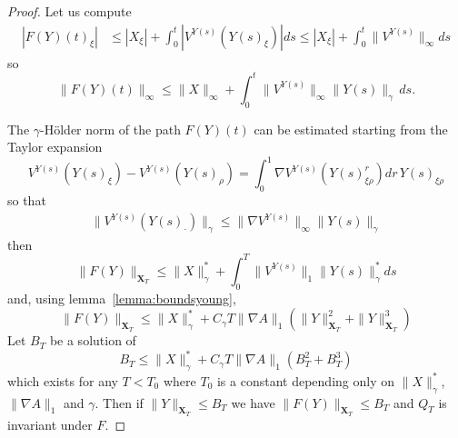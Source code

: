 \documentclass[a4paper,12pt,reqno]{amsart}
\newcommand{\norm}[1]{\|#1\|}
\newcommand{\XT}{\mathbf{X}_T}
\begin{document}
\begin{proof}
Let us compute
\begin{equation*}
  \begin{split}
    |F(Y)(t)_\xi| & \le |X_\xi| + \int_0^t |V^{Y(s)}(Y(s)_\xi)| ds
\le |X_\xi| + \int_0^t \norm{V^{Y(s)}}_\infty ds
  \end{split}
\end{equation*}
so
\begin{equation*}
  \|F(Y)(t)\|_{\infty} \le \|X\|_{\infty} +  \int_0^t
   \|V^{Y(s)}\|_\infty \|Y(s)\|_{\gamma} \, ds.
\end{equation*}

The $\gamma$-H\"older norm of the path $F(Y)(t)$ can be estimated
starting from the Taylor expansion
\begin{equation*}
  V^{Y(s)}(Y(s)_\xi) - V^{Y(s)}(Y(s)_\rho) = \int_0^1 \nabla V^{Y(s)}(Y(s)^r_{\xi\rho}) dr\, Y(s)_{\xi\rho}
\end{equation*}
so that
\begin{equation*}
  \begin{split}
 \|V^{Y(s)}(Y(s)_\cdot)\|_{\gamma} \le \| \nabla V^{Y(s)}\|_\infty
  \|Y(s)\|_{\gamma}
\end{split}
\end{equation*}
then
\begin{equation*}
  \norm{F(Y)}_{\XT} \le \norm{X}^*_\gamma + \int_0^T \| V^{Y(s)}\|_1 \norm{Y(s)}_{\gamma}^* ds
\end{equation*}
and, using  lemma~\ref{lemma:boundsyoung},
\begin{equation*}
  \norm{F(Y)}_{\XT} \le \norm{X}_\gamma^* + C_\gamma T \norm{\nabla A}_1 (\norm{Y}_{\XT}^2+\norm{Y}_{\XT}^3)
\end{equation*}
Let $B_T$ be a solution of
\begin{equation*}
B_T \le \norm{X}_\gamma^* + C_\gamma T \norm{\nabla A}_1 (B_T^2 + B_T^3)
\end{equation*}
which exists for any $T < T_0$ where $T_0$ is a constant depending
only on $\norm{X}_\gamma^*$, $\norm{\nabla A}_1$ and $\gamma$.
Then if $\|Y\|_{\XT} \le B_T$  we have
$\|F(Y)\|_{\XT} \le B_T$ and $Q_{T}$ is invariant under $F$.


\end{proof}
\end{document}
